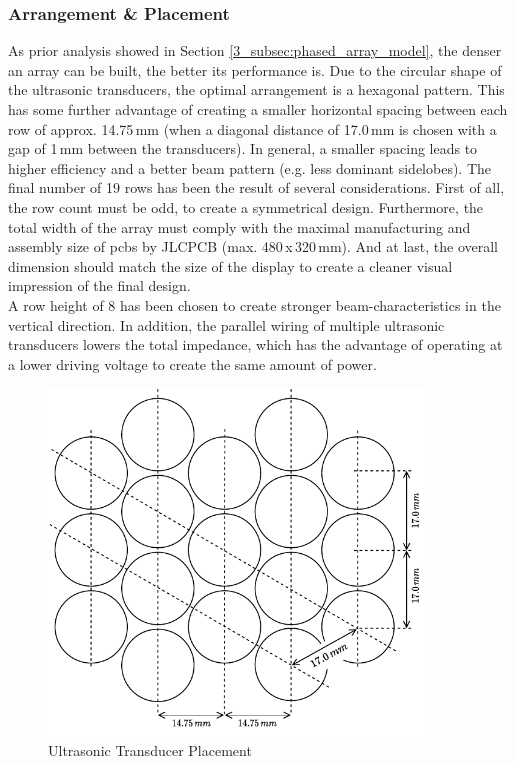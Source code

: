 \subsubsection{Arrangement \& Placement}
As prior analysis showed in Section \ref{3_subsec:phased_array_model}, the denser an array can be built, the better its performance is. Due to the circular shape of the ultrasonic transducers, the optimal arrangement is a hexagonal pattern. This has some further advantage of creating a smaller horizontal spacing between each row of approx. 14.75\,mm (when a diagonal distance of 17.0\,mm is chosen with a gap of 1\,mm between the transducers). In general, a smaller spacing leads to higher efficiency and a better beam pattern (e.g. less dominant sidelobes).
The final number of 19 rows has been the result of several considerations. First of all, the row count must be odd, to create a symmetrical design. Furthermore, the total width of the array must comply with the maximal manufacturing and assembly size of \acrshort{pcb}s by JLCPCB (max. 480\,x\,320\,mm). And at last, the overall dimension should match the size of the display to create a cleaner visual impression of the final design.\\
A row height of 8 has been chosen to create stronger beam-characteristics in the vertical direction. In addition, the parallel wiring of multiple ultrasonic transducers lowers the total impedance, which has the advantage of operating at a lower driving voltage to create the same amount of power.

\bigskip
\begin{figure}[h!]
	\centering
	\includegraphics[width=10cm]{images/4_Design/Hardware/Transducer Placement.pdf}
	\vspace{0.2cm}
    \caption{Ultrasonic Transducer Placement}
    \label{fig:transducer-placement}
\end{figure}
\newpage

